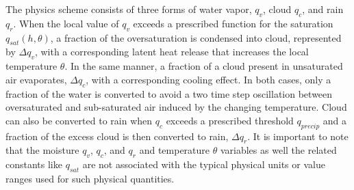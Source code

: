    The \cite{zerroukat2015moist} physics scheme consists of three forms of water vapor, 
$q_v$, cloud $q_c$, and rain $q_r$.  When the local value of $q_v$ exceeds a 
prescribed function for the saturation $q_{sat}(h, \theta)$, a fraction of the 
oversaturation is condensed into cloud, represented by $\Delta q_v$, with a corresponding latent 
heat release that increases the local temperature $\theta$. In the same manner, 
a fraction of a cloud present in unsaturated air evaporates, $\Delta q_c$, 
with a corresponding cooling effect. In both cases, only a fraction of the water is 
converted to avoid a two time step oscillation between oversaturated and sub-saturated 
air induced by the changing temperature. Cloud can also be converted to rain when $q_c$ 
exceeds a prescribed threshold $q_{precip}$ and a fraction of the excess cloud is then 
converted to rain, $\Delta q_r$. It is important to note that
the moisture $q_v$, $q_c$, and $q_r$ and temperature $\theta$ variables as well the 
related constants like $q_{sat}$ are not associated with the 
typical physical units or value ranges used for
such physical quantities.

